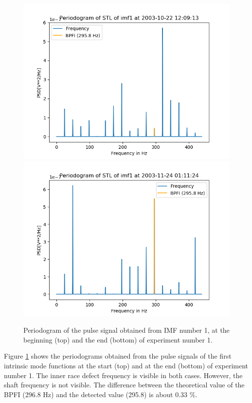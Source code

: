 \documentclass[../Main/thesis.tex]{subfiles}
\begin{document}
\begin{figure}[H]
	\centering
	\includegraphics[width=0.8\linewidth]{../fig/periodogram_bpfi/start_imf1_bpfi}
	\includegraphics[width=0.8\linewidth]{../fig/periodogram_bpfi/end_imf1_bpfi}
	\caption{Periodogram of the pulse signal obtained from IMF number 1, at the beginning (top) and the end (bottom) of experiment number 1.}
	\label{fig:startimf1bpfi}
\end{figure}
\justify
Figure \ref{fig:startimf1bpfi} shows the periodograms obtained from the pulse signals of the first intrinsic mode functions at the start (top) and at the end (bottom) of experiment number 1. The inner race defect frequency is visible in both cases.
However, the shaft frequency is not visible. The difference between the theoretical value of the BPFI (296.8 Hz) and the detected value (295.8) is about 0.33 $\%$.
\end{document}
